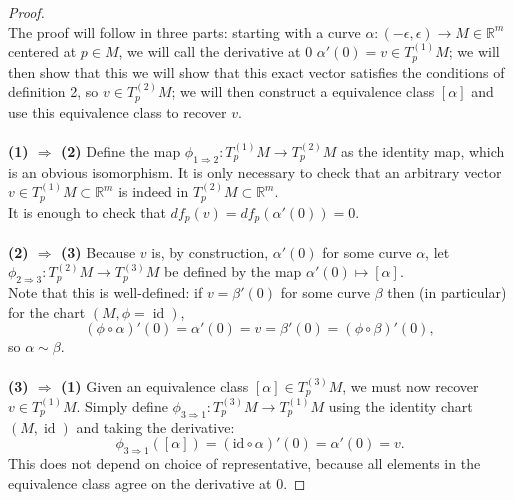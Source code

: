 \documentclass{article}
\begin{document}
\begin{proof} \text{} \\
  The proof will follow in three parts: starting with a curve
  $\alpha\colon (-\epsilon,\epsilon) \rightarrow M \in \mathbb{R}^m$
  centered at $p \in M$, we will call the derivative at 0
  $\alpha'(0) = v \in T_p^{(1)}M$; we will then show that this
  we will show that this exact vector satisfies the conditions of definition 2,
  so $v \in T_p^{(2)}M$; we will then construct a equivalence class $[\alpha]$
  and use this equivalence class to recover $v$.\\~\\
  \textbf{(1) $\Longrightarrow$ (2)}
    Define the map $\phi_{1\Rightarrow2}: T_p^{(1)}M \rightarrow T_p^{(2)}M$
    as the identity map, which is an obvious isomorphism. It is only necessary
    to check that an arbitrary vector $v \in T_p^{(1)}M \subset \mathbb{R}^m$
    is indeed in $T_p^{(2)}M \subset \mathbb{R}^m$.\\
    It is enough to check that $df_p(v) = df_p(\alpha'(0)) = 0$.
  \\~\\
  \textbf{(2) $\Longrightarrow$ (3)}
    Because $v$ is, by construction, $\alpha'(0)$ for some curve $\alpha$, let
    $\phi_{2\Rightarrow3}: T_p^{(2)}M \rightarrow T_p^{(3)}M$ be defined by the
    map $\alpha'(0) \mapsto [\alpha]$.\\
    Note that this is well-defined: if $v = \beta'(0)$ for some curve $\beta$
    then (in particular) for the chart $(M, \phi = \operatorname{id})$, \[
      (\phi \circ \alpha)'(0) = \alpha'(0) = v = \beta'(0) = (\phi \circ \beta)'(0),
    \] so $\alpha \sim \beta$.
  \\~\\
  \textbf{(3) $\Longrightarrow$ (1)}
    Given an equivalence class $[\alpha] \in T_p^{(3)}M$, we must now recover
    $v \in T_p^{(1)}M$. Simply define
    $\phi_{3\Rightarrow1}: T_p^{(3)}M \rightarrow T_p^{(1)}M$
    using the identity chart $(M, \operatorname{id})$ and taking the derivative: \[
      \phi_{3\Rightarrow1}([\alpha]) = (\text{id} \circ \alpha)'(0) = \alpha'(0) = v.
    \] This does not depend on choice of representative, because all
    elements in the equivalence class agree on the derivative at $0$.
\end{proof}

\pagebreak
\end{document}
